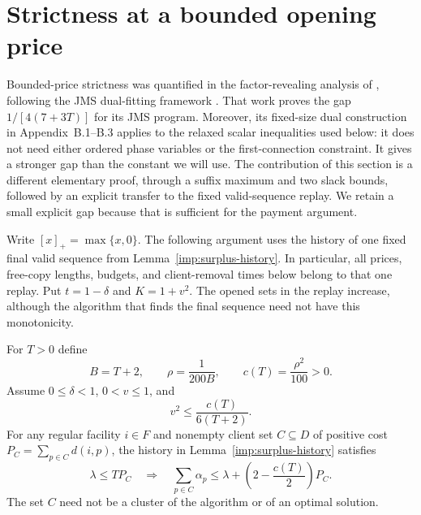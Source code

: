 \section{Strictness at a bounded opening price}
\label{str:section}

Bounded-price strictness was quantified in the factor-revealing
analysis of \cite[Appendix~B, Corollary~2]{CGLS2026}, following the
JMS dual-fitting framework \cite{JMS2002,JainEtAl2003}.  That work
proves the gap $1/[4(7+3T)]$ for its JMS program.  Moreover, its
fixed-size dual construction in Appendix~B.1--B.3 applies to the
relaxed scalar inequalities used below: it does not need either
ordered phase variables or the first-connection constraint.  It gives
a stronger gap than the constant we will use.  The contribution of
this section is a different elementary proof, through a suffix maximum
and two slack bounds, followed by an explicit transfer to the fixed
valid-sequence replay.  We retain a small explicit gap because that
is sufficient for the payment argument.

Write $[x]_+=\max\{x,0\}$.  The following argument uses the history
of one fixed final valid sequence from Lemma~\ref{imp:surplus-history}.
In particular, all prices, free-copy lengths, budgets, and client-removal times
below belong to that one replay.  Put $t=1-\delta$ and $K=1+v^2$.
The opened sets in the replay increase, although the algorithm that finds
the final sequence need not have this monotonicity.

\begin{lemma}\label{str:strictness}
For $T>0$ define
\begin{equation}\label{str:constants}
 B=T+2,\qquad \rho=\frac{1}{200B},\qquad
 c(T)=\frac{\rho^2}{100}>0.
\end{equation}
Assume $0\le\delta<1$, $0<v\le1$, and
\begin{equation}\label{str:v-condition}
 v^2\le\frac{c(T)}{6(T+2)}.
\end{equation}
For any regular facility $i\in F$ and nonempty client set $C\subseteq D$
of positive cost $P_C=\sum_{p\in C}d(i,p)$, the history in
Lemma~\ref{imp:surplus-history} satisfies
\begin{equation}\label{str:conclusion}
 \lambda\le TP_C
 \quad\Longrightarrow\quad
 \sum_{p\in C}\alpha_p
 \le \lambda+\left(2-\frac{c(T)}2\right)P_C.
\end{equation}
The set $C$ need not be a cluster of the algorithm or of an optimal solution.
\end{lemma}


